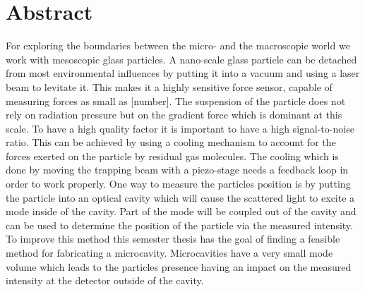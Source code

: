 \section*{Abstract}
For exploring the boundaries between the micro- and the macroscopic world we work with mesoscopic glass particles. A nano-scale glass particle can be detached from most environmental influences by putting it into a vacuum and using a laser beam to levitate it. This makes it a highly sensitive force sensor, capable of measuring forces as small as [number]. The suspension of the particle does not rely on radiation pressure but on the gradient force which is dominant at this scale. To have a high quality factor it is important to have a high signal-to-noise ratio. This can be achieved by using a cooling mechanism to account for the forces exerted on the particle by residual gas molecules. The cooling which is done by moving the trapping beam with a piezo-stage needs a feedback loop in order to work properly. One way to measure the particles position is by putting the particle into an optical cavity which will cause the scattered light to excite a mode inside of the cavity. Part of the mode will be coupled out of the cavity and can be used to determine the position of the particle via the measured intensity. To improve this method this semester thesis has the goal of finding a feasible method for fabricating a microcavity. Microcavities have a very small mode volume which leads to the particles presence having an impact on the measured intensity at the detector outside of the cavity.
